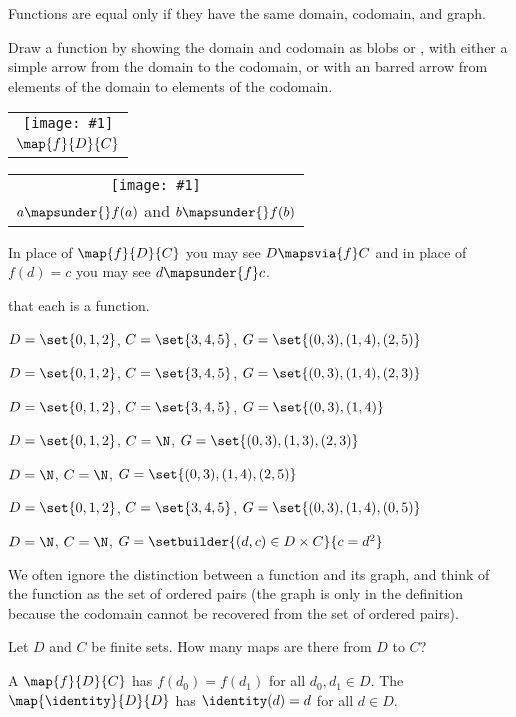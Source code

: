 \documentclass{ibl}
\makeatletter
\newcommand{\grf}[2]{\begin{tabular}{@{}c@{}}\texttt{[image: \#1]} \\ #2\end{tabular}}
\makeatother
\begin{document}
\noindent Functions are equal only if they have the same domain, codomain,
and graph.

Draw a function by showing the domain and codomain as blobs 
or , with either a simple arrow from the domain to
the codomain,  
or with an barred arrow from elements of the domain to elements of the
codomain.
\begin{center}
  \grf{asy/bean_fcn.pdf}{$\map{f}{D}{C}$}
  \hspace{10em}
  \grf{asy/bean_fcn_elets.pdf}{$a\mapsunder{}f(a)$ and $b\mapsunder{}f(b)$}
\end{center}
In place of $\map{f}{D}{C}$ you may see $D\mapsvia{f} C$ and
in place of $f(d)=c$ you may see $d\mapsunder{f}c$.

\begin{ex} \pord{} that each is a function.\label{FindFunctions}
\begin{exes}
\item $D=\set{0,1,2}$, $C=\set{3,4,5}$,
  $G=\set{(0,3), (1,4), (2,5)}$    
\item $D=\set{0,1,2}$, $C=\set{3,4,5}$,
  $G=\set{(0,3), (1,4), (2,3)}$    
\item $D=\set{0,1,2}$, $C=\set{3,4,5}$,
  $G=\set{(0,3), (1,4)}$    
\item $D=\set{0,1,2}$, $C=\N$,
  $G=\set{(0,3), (1,3), (2,3)}$    
\item $D=\N$, $C=\N$,
  $G=\set{(0,3), (1,4), (2,5)}$    
\item $D=\set{0,1,2}$, $C=\set{3,4,5}$,
  $G=\set{(0,3), (1,4), (0,5)}$    
\item $D=\N$, $C=\N$,
  $G=\setbuilder{(d,c)\in D\times C}{c=d^2}$    
\end{exes}
\end{ex}

We often ignore the distinction between a function and its graph, and 
think of the function as the set of ordered pairs 
(the graph is only in the definition because the codomain cannot be recovered
from the set of ordered pairs).

\begin{ex}
Let $D$ and $C$ be finite sets.
How many maps are there from $D$ to $C$?
\end{ex}

\begin{df}
A  $\map{f}{D}{C}$ has  
$f(d_0)=f(d_1)$ for all $d_0,d_1\in D$.
The  $\map{\identity}{D}{D}$ has
$\identity(d)=d$ for all $d\in D$.
\end{df}
\end{document}

